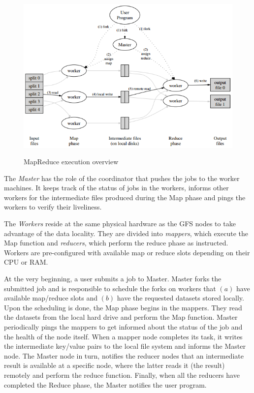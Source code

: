 \begin{figure}
\centering
\includegraphics[scale=0.8]{resources/images/Background/mapreduce_exec_overview.png}
\label{fig:mapreduce_execution_overview}
\caption{MapReduce execution overview \cite{Dean:2004:MSD:1251254.1251264}}
\end{figure}

The \emph{Master} has the role of the coordinator that pushes the jobs
to the worker machines. It keeps track of the status of jobs in the
workers, informs other workers for the intermediate files produced
during the Map phase and pings the workers to verify their liveliness.

The \emph{Workers} reside at the same physical hardware as the GFS
nodes to take advantage of the data locality. They are divided into
\emph{mappers}, which execute the Map function and \emph{reducers},
which perform the reduce phase as instructed. Workers are
pre-configured with available map or reduce slots depending on their
CPU or RAM.

At the very beginning, a user submits a job to Master. Master forks
the submitted job and is responsible to schedule the forks on workers
that $(a)$ have available map/reduce slots and $(b)$ have the
requested datasets stored locally. Upon the scheduling is done, the
Map phase begins in the mappers. They read the datasets from the local
hard drive and perform the Map function. Master periodically pings the
mappers to get informed about the status of the job and the health of
the node itself. When a mapper node completes its task, it writes the
intermediate key/value pairs to the local file system and informs the
Master node. The Master node in turn, notifies the reducer nodes that
an intermediate result is available at a specific node, where the
latter reads it (the result) remotely and perform the reduce
function. Finally, when all the reducers have completed the Reduce
phase, the Master notifies the user program.

